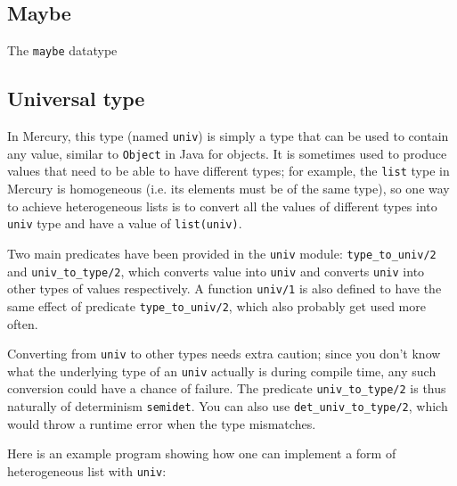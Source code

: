 \subsection{Maybe}

The \texttt{maybe} datatype

\subsection{Universal type}

In Mercury, this type (named \texttt{univ}) is simply a type that can be used to contain any value, similar to \texttt{Object} in Java for objects. It is sometimes used to produce values that need to be able to have different types; for example, the \texttt{list} type in Mercury is homogeneous (i.e. its elements must be of the same type), so one way to achieve heterogeneous lists is to convert all the values of different types into \texttt{univ} type and have a value of \texttt{list(univ)}.

Two main predicates have been provided in the \texttt{univ} module: \texttt{type_to_univ/2} and \texttt{univ_to_type/2}, which converts value into \texttt{univ} and converts \texttt{univ} into other types of values respectively. A function \texttt{univ/1} is also defined to have the same effect of predicate \texttt{type_to_univ/2}, which also probably get used more often.

Converting from \texttt{univ} to other types needs extra caution; since you don't know what the underlying type of an \texttt{univ} actually is during compile time, any such conversion could have a chance of failure. The predicate \texttt{univ_to_type/2} is thus naturally of determinism \texttt{semidet}. You can also use \texttt{det_univ_to_type/2}, which would throw a runtime error when the type mismatches.

Here is an example program showing how one can implement a form of heterogeneous list with \texttt{univ}:

